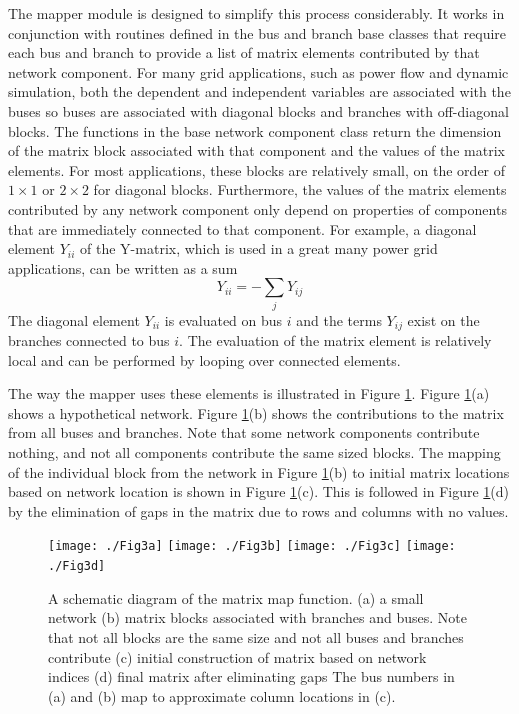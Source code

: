 \documentclass[preprint]{acm_proc_article-sp}
\begin{document}
The mapper module is designed to simplify this process considerably. It works in
conjunction with routines defined in the bus and branch base classes that
require each bus and branch to provide a list of matrix elements contributed by
that network component. For many grid applications, such as power flow and dynamic
simulation, both the dependent and independent variables are associated with
the buses so buses are associated with diagonal blocks and branches with
off-diagonal blocks. The functions in the base network component class
return the dimension of the matrix block associated with that component and the
values of the matrix elements. For most applications, these blocks are
relatively small, on the order of $1\times 1$ or $2\times 2$ for diagonal
blocks. Furthermore, the values of the matrix elements contributed by any
network component only depend on properties of components that are immediately
connected to that component. For example, a diagonal element $Y_{ii}$ of the
Y-matrix, which is used in a great many power grid applications,
can be written as a sum
\[
Y_{ii} = -\sum_j Y_{ij}
\]
The diagonal element $Y_{ii}$ is evaluated on bus $i$ and the terms $Y_{ij}$
exist on the branches connected to bus $i$. The evaluation of the matrix element
is relatively local and can be performed by looping over connected elements.

The way the mapper uses these elements is illustrated in Figure
\ref{mapper}. Figure \ref{mapper}(a) shows a hypothetical network.
Figure \ref{mapper}(b) shows the contributions to the matrix from all buses
and branches. Note that some network components contribute nothing, and
not all components contribute the same sized blocks.  The mapping of the individual
block from the network in Figure \ref{mapper}(b) to initial matrix locations
based on network location is shown in Figure \ref{mapper}(c). This is followed
in Figure \ref{mapper}(d) by the elimination of gaps in the matrix due to rows
and columns with no values.
\begin{figure}
\centering
\texttt{[image: ./Fig3a]}
\texttt{[image: ./Fig3b]}
\texttt{[image: ./Fig3c]}
\texttt{[image: ./Fig3d]}
\caption{\label{mapper} A schematic diagram of the matrix map function.
(a) a small network (b)
matrix blocks associated with branches and buses. Note that not all blocks are
the same size and not all buses and branches contribute (c) initial construction
of matrix based on network indices (d) final matrix after eliminating gaps
The bus numbers in (a) and (b) map to approximate column locations in (c).}
\end{figure}
\end{document}
